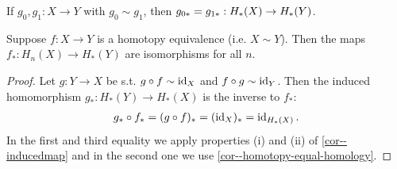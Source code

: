 \documentclass[a4paper,11pt]{article}
\begin{document}

			\begin{cor}\label{cor--homotopy-equal-homology}
				If $g_0,g_1:X\rightarrow Y$ with $g_0\sim g_1$, then $g_{0\ast}=g_{1\ast}:H_{\ast}(X)\rightarrow H_{\ast}(Y)$.
			\end{cor}	

			\begin{cor}\label{cor--homotopic-spaces-same-homology}
				Suppose $f:X\rightarrow Y$ is a homotopy equivalence (i.e. $X\sim Y$). Then the maps $f_\ast:H_n(X)\rightarrow H_\ast(Y)$ are isomorphisms for all $n$.
			\end{cor}
			\begin{proof}
				Let $g:Y\rightarrow X$ be s.t. $g\circ f\sim\operatorname{id}_X$ and $f\circ g\sim\operatorname{id}_Y$. Then the induced homomorphism $g_\ast:H_\ast(Y)\rightarrow H_\ast(X)$ is the inverse to $f_\ast$:
				\begin{align*}
					g_\ast\circ f_\ast=(g\circ f)_\ast=(\operatorname{id}_X)_\ast=\operatorname{id}_{H_\ast(X)}.
				\end{align*}
				In the first and third equality we apply properties (i) and (ii) of \autoref{cor--inducedmap} and in the second one we use \autoref{cor--homotopy-equal-homology}. 
			\end{proof}
\end{document}
